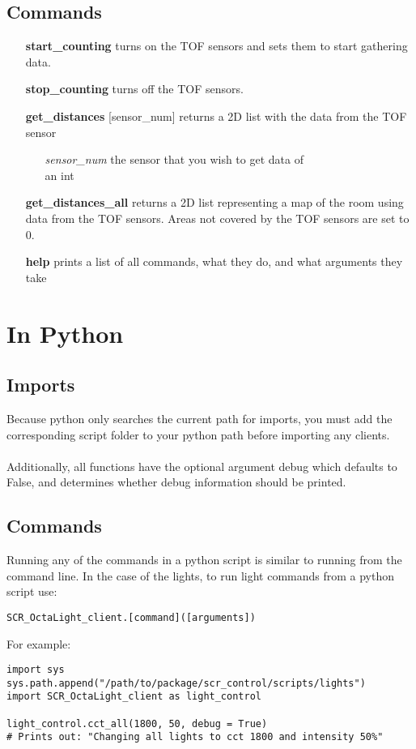\documentclass[twoside]{article}
\begin{document}
	\subsection{Commands}
	
	\begin{enumerate}
		\item[\bf start\_counting]
		turns on the TOF sensors and sets them to start gathering data.
		
		\item[\bf stop\_counting]
		turns off the TOF sensors.
		
		\item[\bf get\_distances] [sensor\_num]
		returns a 2D list with the data from the TOF sensor
		
		\begin{enumerate}[leftmargin=3\parindent]
			\item[\it sensor\_num] the sensor that you wish to get data of\\ 
			an int
		\end{enumerate}
		
		\item[\bf get\_distances\_all]
		returns a 2D list representing a map of the room using data from the TOF sensors. Areas not covered by the TOF sensors are set to 0. 
		
		\item[\bf help] prints a list of all commands, what they do, and what arguments they take
	\end{enumerate}

	\section{In Python}


\subsection{Imports}
Because python only searches the current path for imports, you must add the corresponding script folder to your python path before importing any clients. \\ \\
Additionally, all functions have the optional argument debug which defaults to False, and determines whether debug information should be printed.

\subsection{Commands}
Running any of the commands in a python script is similar to running from the command line. In the case of the lights, to run light commands from a python script use:
\begin{verbatim}
SCR_OctaLight_client.[command]([arguments])
\end{verbatim}


For example:
\begin{verbatim}
import sys
sys.path.append("/path/to/package/scr_control/scripts/lights")
import SCR_OctaLight_client as light_control

light_control.cct_all(1800, 50, debug = True) 
# Prints out: "Changing all lights to cct 1800 and intensity 50%"
\end{verbatim}

	
\end{document}
